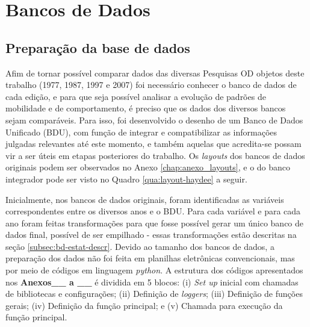 \clearpage
\section{Bancos de Dados}\label{sec:bd}

\subsection{Preparação da base de dados}\label{subsec:bd-prep}

Afim de tornar possível comparar dados das diversas Pesquisas OD objetos deste trabalho (1977, 1987, 1997 e 2007) foi necessário conhecer o banco de dados de cada edição, e para que seja possível analisar a evolução de padrões de mobilidade e de comportamento, é preciso que os dados dos diversos bancos sejam comparáveis. Para isso, foi desenvolvido o desenho de um Banco de Dados Unificado (BDU), com função de integrar e compatibilizar as informações julgadas relevantes até este momento, e também aquelas que acredita-se possam vir a ser úteis em etapas posteriores do trabalho. Os \emph{layouts} dos bancos de dados originais podem ser observados no Anexo \ref{chap:anexo_layouts}, e o do banco integrador pode ser visto no Quadro \ref{qua:layout-haydee} a seguir.

Inicialmente, nos bancos de dados originais, foram identificadas as variáveis correspondentes entre os diversos anos e o BDU. Para cada variável e para cada ano foram feitas transformações para que fosse possível gerar um único banco de dados final, possível de ser empilhado - essas transformações estão descritas na seção \ref{subsec:bd-estat-descr}. Devido ao tamanho dos bancos de dados, a preparação dos dados não foi feita em planilhas eletrônicas convencionais, mas por meio de códigos em linguagem \textit{python}. A estrutura dos códigos apresentados nos \textbf{Anexos__ a __} é dividida em 5 blocos: (i) \textit{Set up} inicial com chamadas de bibliotecas e configurações; (ii) Definição de \textit{loggers}; (iii) Definição de funções gerais; (iv) Definição da função principal; e (v) Chamada para execução da função principal.\\ 

